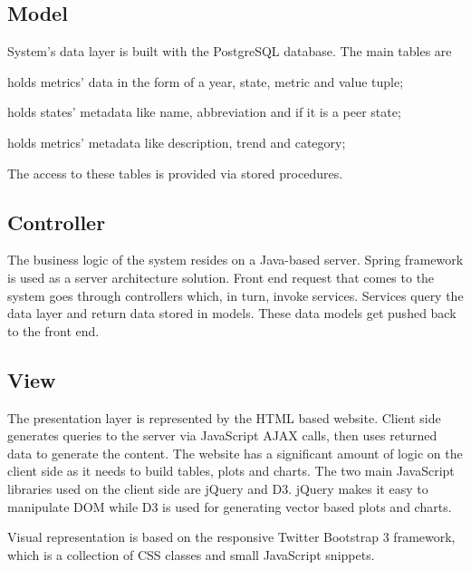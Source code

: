 		\subsection{Model}
			
			System's data layer is built with the PostgreSQL database. The main tables are
			
			\begin{description}[itemsep=-1.5mm, align=right,labelwidth=3cm]
				\item [Statistics]
					holds metrics' data in the form of a year, state, metric and value tuple;
				\item [States]
					holds states' metadata like name, abbreviation and if it is a peer state;
				\item [Metrics]
					holds metrics' metadata like description, trend and category;							
			\end{description}
			
			The access to these tables is provided via stored procedures.
			
		\subsection{Controller}
		
			The business logic of the system resides on a Java-based server. Spring framework is 
			used as a server architecture solution. Front end request that comes to the system goes 
			through controllers which, in turn, invoke services. Services query the data layer and return 
			data stored	in models. These data models get pushed back to the front end.
			
		\subsection{View}
			
			The presentation layer is represented by the HTML based website. Client side generates 
			queries to the server via JavaScript AJAX calls, then uses returned data to generate the content.
			The website has a significant amount of logic on the client side as it needs to build 
			tables, plots and charts. The two main JavaScript libraries used on the client side are jQuery and D3.
			jQuery makes it easy to manipulate DOM while D3 is used for generating vector based plots and charts.
			
			Visual representation is based on the responsive Twitter Bootstrap 3 framework, 
			which is a collection of CSS classes and small JavaScript snippets. 


